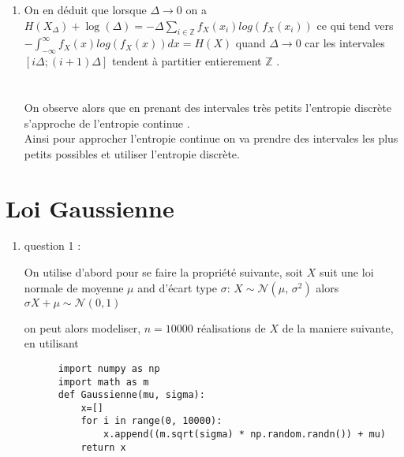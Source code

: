 \documentclass[a4paper]{article}
\begin{document}
\begin{enumerate}
\item On en déduit que lorsque $\Delta\to 0 $ on a $H(X_{\Delta})+ \log(\Delta) = -\Delta \sum_{i \in \mathbb{Z}} f_{X}(x_{i})log(f_{X}(x_{i}))$ ce qui tend vers $  - \int_{-\infty}^{\infty}f_{X}(x)log(f_{X}(x))dx = H(X)$ quand $\Delta\to 0$  car les intervales $[i\Delta;(i+1)\Delta]$ tendent à partitier entierement $ \mathbb{Z} $ .\\
  \\
  \\
    On observe alors que en prenant des intervales très petits l'entropie discrète s'approche de l'entropie  continue .\\
Ainsi pour approcher l'entropie continue on va prendre  des intervales les plus petits possibles et utiliser l'entropie discrète.

   \end{enumerate} 

\section{Loi Gaussienne}
\begin{enumerate}
  \item question 1 :

    On utilise d'abord pour se faire la propriété suivante, 
    soit $X$ suit une loi normale de moyenne $\mu$ and d'écart type $\sigma$: $X \sim \mathcal{N}(\mu,\,\sigma^{2})$
    alors $ \sigma X + \mu \sim \mathcal{N}(0, 1)$

    on peut alors modeliser, $n = 10000$ réalisations de $X$ de la maniere suivante, en utilisant 
    \begin{verbatim}
      import numpy as np
      import math as m
      def Gaussienne(mu, sigma):
          x=[]
          for i in range(0, 10000):
              x.append((m.sqrt(sigma) * np.random.randn()) + mu)
          return x
    \end{verbatim}

\end{enumerate}
\end{document}
